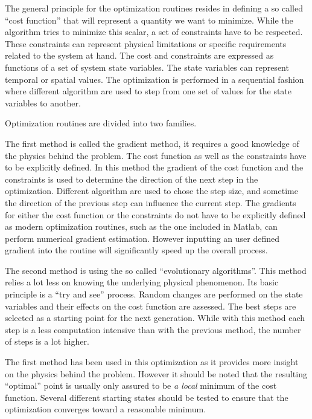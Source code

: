 
The general principle for the optimization routines resides in defining a so called ``cost function'' that will represent a quantity we want to minimize.
While the algorithm tries to minimize this scalar, a set of constraints have to be respected. 
These constraints can represent physical limitations or specific requirements related to the system at hand.
The cost and constraints are expressed as functions of a set of system state variables.
The state variables can represent temporal or spatial values.
The optimization is performed in a sequential fashion where different algorithm are used to step from one set of values for the state variables to another. 

\par Optimization routines are divided into two families. 

\par The first method is called the gradient method, it requires a good knowledge of the physics behind the problem.
The cost function as well as the constraints have to be explicitly defined.
In this method the gradient of the cost function and the constraints is used to determine the direction of the next step in the optimization.
Different algorithm are used to chose the step size, and sometime the direction of the previous step can influence the current step.
The gradients for either the cost function or the constraints do not have to be explicitly defined as modern optimization routines, such as the one included in Matlab, can perform numerical gradient estimation.
However inputting an user defined gradient into the routine will significantly speed up the overall process.

\par The second method is using the so called ``evolutionary algorithms''. 
This method relies a lot less on knowing the underlying physical phenomenon.
Its basic principle is a ``try and see'' process.
Random changes are performed on the state variables and their effects on the cost function are assessed.
The best steps are selected as a starting point for the next generation.
While with this method each step is a less computation intensive than with the previous method, the number of steps is a lot higher.

\par The first method has been used in this optimization as it provides more insight on the physics behind the problem.
However it should be noted that the resulting ``optimal'' point is usually only assured to be \emph{a local} minimum of the cost function.
Several different starting states should be tested to ensure that the optimization converges toward a reasonable minimum.



